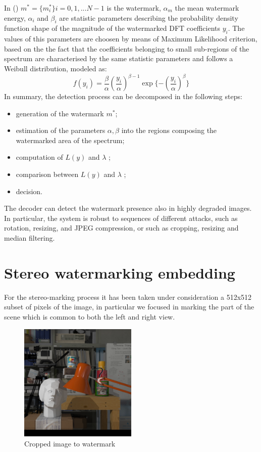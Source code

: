 In ()  $m^{*} = \{ m^{*}_{i} \} i= 0,1,...N-1$ is the watermark, $\alpha_{m}$ the mean watermark energy, $\alpha_{i}$ and $\beta_{i}$ are statistic parameters describing the probability density function shape of the magnitude of the watermarked DFT coefficients $y_{i}$.\newline 
The values of this parameters are choosen by means of Maximum Likelihood criterion, based on the the fact that the coefficients belonging to small
sub-regions of the spectrum are characterised by the same statistic parameters and follows a Weibull distribution, modeled as:
$$ f(y_{i}) = \frac{\beta}{\alpha}(\frac{y_{i}}{\alpha})^{\beta-1}\exp\{-(\frac{y_{i}}{\alpha})^{\beta}\}$$
In summary, the detection process can be decomposed in the following steps:
\begin{itemize}
\item generation of the watermark $m^{*}$;
\item estimation of the parameters $\alpha,\beta$ into the regions composing the watermarked area of the spectrum;
\item computation of $L(y)$ and $\lambda$ ;
\item comparison between $L(y)$ and $\lambda$ ;
\item decision.
\end{itemize}

The decoder can detect the watermark presence also in highly degraded images. In particular, the system is robust to sequences of different attacks, such as rotation, resizing, and JPEG compression, or such as cropping, resizing and median filtering.

\section{Stereo watermarking embedding}

For the stereo-marking process it has been taken under consideration a 512x512 subset of pixels of the image, in particular we focused in marking the part of the scene which is common to both the left and right view.

\begin{figure}[h!]
\centering
\includegraphics[width=0.5\textwidth]{./img/squared.png}
\caption{\small{Cropped image to watermark}}
\label{fig:cropped}
\end{figure}

